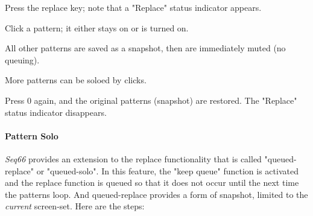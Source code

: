    \begin{enumber}
      \item Press the replace key; note that a "Replace" status
         indicator appears.
      \item Click a pattern; it either stays on or is turned on.
      \item All other patterns are saved as a snapshot, then are immediately
          muted (no queuing).
      \item More patterns can be soloed by clicks.
      \item Press 0 again, and the original patterns (snapshot) are restored.
          The "Replace" status indicator disappears.
   \end{enumber}

\paragraph{Pattern Solo}
\label{paragraph:patterns_pattern_solo}

   \textsl{Seq66} provides an extension to the replace functionality
   that is called "queued-replace" or "queued-solo".
   In this feature, the "keep queue" function is activated and the
   replace function is queued so that it does not occur until the next
   time the patterns loop.
   And queued-replace provides a form of snapshot, limited to the
   \textsl{current} screen-set.
   Here are the steps:

